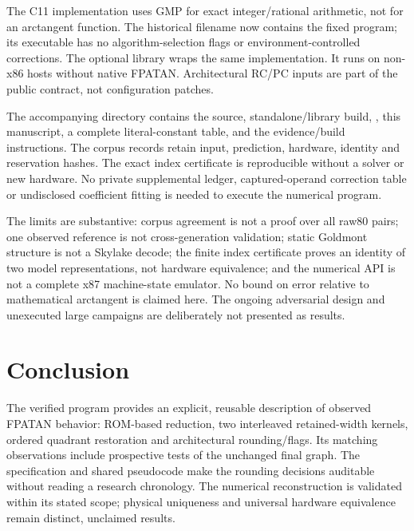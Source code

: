 \documentclass[11pt]{article}
\begin{document}
The C11 implementation uses GMP for exact integer/rational arithmetic, not
for an arctangent function. The historical filename
 now contains the fixed program; its executable
has no algorithm-selection flags or environment-controlled corrections.
The optional library wraps the same implementation. It runs on non-x86
hosts without native FPATAN. Architectural RC/PC inputs are part of the
public contract, not configuration patches.

The accompanying directory contains the source, standalone/library build,
, this manuscript, a complete literal-constant table,
and the evidence/build instructions. The corpus records retain input,
prediction, hardware, identity and reservation hashes. The exact index
certificate is reproducible without a solver or new hardware. No private
supplemental ledger, captured-operand correction table or undisclosed
coefficient fitting is needed to execute the numerical program.

The limits are substantive: corpus agreement is not a proof over all raw80
pairs; one observed reference is not cross-generation validation; static
Goldmont structure is not a Skylake decode; the finite index certificate
proves an identity of two model representations, not hardware equivalence;
and the numerical API is not a complete x87 machine-state emulator. No
bound on error relative to mathematical arctangent is claimed here. The
ongoing adversarial design and unexecuted large campaigns are deliberately
not presented as results.

\section{Conclusion}

The verified program provides an explicit, reusable description of observed
FPATAN behavior: ROM-based reduction, two interleaved retained-width
kernels, ordered quadrant restoration and architectural rounding/flags.
Its \CorpusRows{} matching observations include \ProspectiveRows{}
prospective tests of the unchanged final graph. The specification and
shared pseudocode make the rounding decisions auditable without reading a
research chronology. The numerical reconstruction is validated within its
stated scope; physical uniqueness and universal hardware equivalence remain
distinct, unclaimed results.
\end{document}
